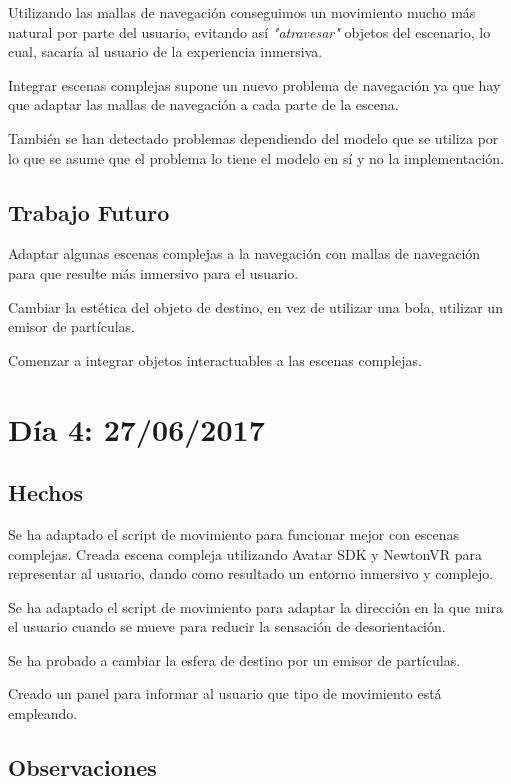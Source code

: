 \documentclass[12pt,a4paper]{article}
\begin{document}
Utilizando las mallas de navegación conseguimos un movimiento mucho más natural por parte del usuario, evitando así \textit{"atravesar"} objetos del escenario, lo cual, sacaría al usuario de la experiencia inmersiva.

Integrar escenas complejas supone un nuevo problema de navegación ya que hay que adaptar las mallas de navegación a cada parte de la escena.

También se han detectado problemas dependiendo del modelo que se utiliza por lo que se asume que el problema lo tiene el modelo en sí y no la implementación.


\subsection{Trabajo Futuro}

Adaptar algunas escenas complejas a la navegación con mallas de navegación para que resulte más inmersivo para el usuario.

Cambiar la estética del objeto de destino, en vez de utilizar una bola, utilizar un emisor de partículas.

Comenzar a integrar objetos interactuables a las escenas complejas.

\section{Día 4: 27/06/2017}

\subsection{Hechos}

Se ha adaptado el script de movimiento para funcionar mejor con escenas complejas.
Creada escena compleja utilizando Avatar SDK y NewtonVR para representar al usuario, dando como resultado un entorno inmersivo y complejo.

Se ha adaptado el script de movimiento para adaptar la dirección en la que mira el usuario cuando se mueve para reducir la sensación de desorientación.

Se ha probado a cambiar la esfera de destino por un emisor de partículas.

Creado un panel para informar al usuario que tipo de movimiento está empleando.

\subsection{Observaciones}
\end{document}
